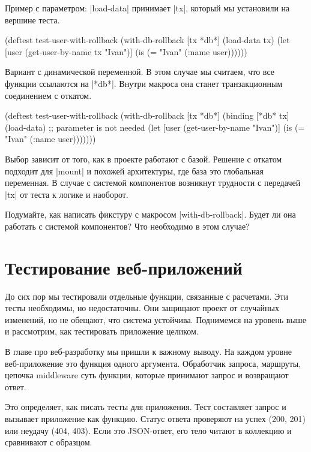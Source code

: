 Пример с параметром: \spverb|load-data| принимает \spverb|tx|, который мы
установили на вершине теста.

\begin{english}
  \begin{clojure}
(deftest test-user-with-rollback
  (with-db-rollback [tx *db*]
    (load-data tx)
    (let [user (get-user-by-name tx "Ivan")]
      (is (= "Ivan" (:name user))))))
  \end{clojure}
\end{english}

Вариант с динамической переменной. В этом случае мы считаем, что все функции
ссылаются на \spverb|*db*|. Внутри макроса она станет транзакционным соединением
с откатом.

\begin{english}
  \begin{clojure}
(deftest test-user-with-rollback
  (with-db-rollback [tx *db*]
    (binding [*db* tx]
      (load-data) ;; parameter is not needed
      (let [user (get-user-by-name "Ivan")]
        (is (= "Ivan" (:name user)))))))
  \end{clojure}
\end{english}

Выбор зависит от того, как в проекте работают с базой. Решение с откатом
подходит для \spverb|mount| и похожей архитектуры, где база это глобальная
переменная. В случае с системой компонентов возникнут трудности с передачей
\spverb|tx| от теста к логике и наоборот.

Подумайте, как написать фикстуру с макросом \spverb|with-db-rollback|. Будет ли
она работать с системой компонентов? Что необходимо в этом случае?

\section{Тестирование веб-приложений}

До сих пор мы тестировали отдельные функции, связанные с расчетами. Эти тесты
необходимы, но недостаточны. Они защищают проект от случайных изменений, но не
обещают, что система устойчива. Поднимемся на уровень выше и рассмотрим, как
тестировать приложение целиком.

В главе про веб-разработку мы пришли к важному выводу. На каждом уровне
веб-приложение это функция одного аргумента. Обработчик запроса, маршруты,
цепочка middleware суть функции, которые принимают запрос и возвращают ответ.

Это определяет, как писать тесты для приложения. Тест составляет запрос и
вызывает приложение как функцию. Статус ответа проверяют на успех (200, 201) или
неудачу (404, 403). Если это JSON-ответ, его тело читают в коллекцию и
сравнивают с образцом.

